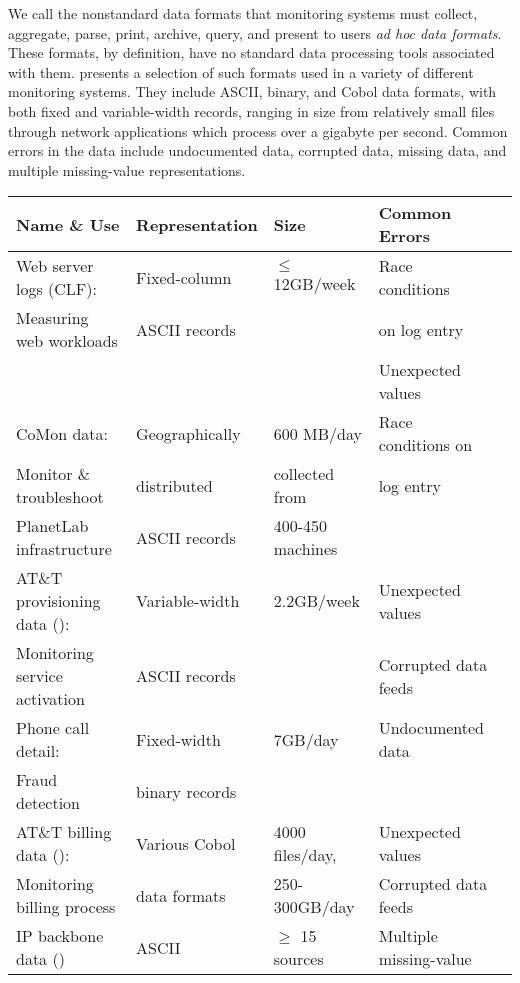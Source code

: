 We call the nonstandard data formats that monitoring systems must
collect, aggregate, parse, print, archive, query, and present to 
users {\em ad hoc data formats}.   These formats, by definition,
have no standard data processing tools associated with them.
 presents a selection of such formats
used in a variety of different monitoring systems.
They include ASCII, binary, and Cobol data formats, with
both fixed and variable-width records, ranging in size from
relatively small files through network applications which process over
a gigabyte per second.  Common errors in the data include undocumented data,
corrupted data, missing data, and multiple missing-value
representations.

\begin{figure*}
\begin{center}
\begin{tabular}{|l|l|l|l|l|}
\hline
Name \& Use   &  Representation              &Size           & Common Errors \\ \hline\hline
Web server logs (CLF): &  Fixed-column  & $\leq$12GB/week & Race conditions \\ 
Measuring web workloads         &  ASCII records &                 & on log entry \\
                                &                &                 & Unexpected values\\ \hline
CoMon data:              &  Geographically & 600 MB/day & Race conditions on\\ 
Monitor \& troubleshoot  &  distributed    & collected from           & log entry \\
PlanetLab infrastructure &  ASCII records  & \appr{}400-450 machines           & \\\hline
AT\&T provisioning data (\dibbler{}): & Variable-width  & 2.2GB/week & Unexpected values \\ 
Monitoring service activation & ASCII records  &            & Corrupted data feeds \\ \hline
Phone call detail:   &  Fixed-width   &\appr{}7GB/day &  Undocumented data\\ 
Fraud detection & binary records & & \\  \hline 
AT\&T billing data (\ningaui{}): & Various Cobol  & \appr{}4000 files/day, & Unexpected values\\ 
Monitoring billing process   & data formats            & 250-300GB/day    & Corrupted data feeds \\ \hline
IP backbone data (\darkstar{})  & ASCII  & $\ge$ 15 sources  & Multiple missing-value \\

\end{tabular}
\end{center}
\end{figure*}

